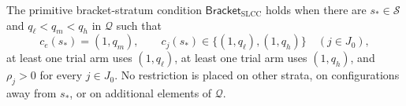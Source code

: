 The primitive bracket-stratum condition \(\mathsf{Bracket}_{\mathrm{SLCC}}\) holds when there are \(s_*\in\mathcal S\) and \(q_\ell<q_m<q_h\) in \(\mathcal Q\) such that
\[
c_e(s_*)=(1,q_m),\qquad
c_j(s_*)\in\{(1,q_\ell),(1,q_h)\}\quad(j\in J_0),
\]
at least one trial arm uses \((1,q_\ell)\), at least one trial arm uses \((1,q_h)\), and \(\rho_j>0\) for every \(j\in J_0\).  No restriction is placed on other strata, on configurations away from \(s_*\), or on additional elements of \(\mathcal Q\).